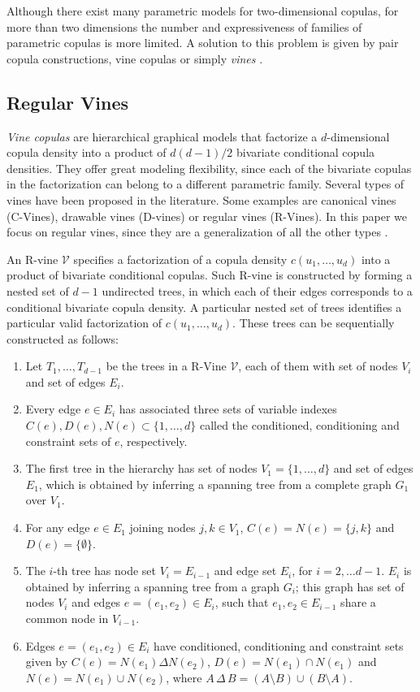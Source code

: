 \documentclass{article}
\begin{document}
Although there exist many parametric models for two-dimensional copulas, for more
than two dimensions the number and expressiveness of families of parametric
copulas is more limited. A solution to this problem is given by pair copula
constructions, vine copulas or simply \emph{vines}
\cite{Joe1996,Bedford2002,Kurowicka2006}.

\subsection{Regular Vines}\label{sec:vines}

\emph{Vine copulas} are hierarchical graphical models that 
factorize a $d$-dimensional copula density into a product of $d(d-1)/2$
bivariate conditional copula densities. They offer great modeling flexibility,
since each of the bivariate copulas in the factorization can belong to a
different parametric family. Several types of vines have been proposed in the
literature. Some examples are canonical vines (C-Vines), drawable vines
(D-vines) or regular vines (R-Vines). In this paper we focus on regular vines,
since they are a generalization of all the other types \cite{rvines}.

An R-vine $\mathcal{V}$ specifies a factorization of a copula density
$c(u_1,\ldots,u_d)$ into a product of bivariate conditional copulas. Such
R-vine is constructed by forming a nested set of $d-1$ undirected trees, in
which each of their edges corresponds to a conditional bivariate copula
density.  A particular nested set of trees identifies a particular valid
factorization of $c(u_1,\ldots,u_d)$. These trees can be sequentially
constructed as follows:

\begin{enumerate}
\item Let $T_1, \ldots, T_{d-1}$ be the trees in a R-Vine $\mathcal{V}$, each
of them with set of nodes $V_i$ and set of edges $E_i$. 
%
\item Every edge $e\in E_i$ has associated three sets of variable indexes
$C(e),D(e),N(e)\subset \{ 1, \ldots, d \}$ called the conditioned, conditioning
and constraint sets of $e$, respectively.
%
\item The first tree in the hierarchy has set of nodes $V_1 = \{1,\ldots,d\}$ and
set of edges $E_1$, which is obtained by inferring a spanning tree from a
complete graph $G_1$ over $V_1$.
%
\item For any edge $e \in E_1$ joining nodes $j,k\in V_1$, $C(e) = N(e) = \{j,k\} $
and $D(e) = \{ \emptyset \}$. 
%
\item The $i$-th tree has node set $V_i = E_{i-1}$ and edge set $E_i$, for $i = 
2,\ldots d-1$. $E_i$ is obtained by inferring a spanning tree from a
graph $G_i$; this graph has set of nodes $V_i$ and edges $e=(e_1,e_2)\in E_i$,
such that $e_1, e_2 \in E_{i-1}$ share a common node in $V_{i-1}$.
%
\item Edges $e=(e_1,e_2)\in E_i$ have conditioned,
conditioning and constraint sets given by $C(e) = N(e_1) \Delta N(e_2)$, $D(e)=
N(e_1) \cap N(e_1)$ and $N(e) = N(e_1)\cup N(e_2)$, where
$A\,\Delta\,B = (A \setminus B) \cup (B \setminus A)$.
\end{enumerate}
\end{document}
